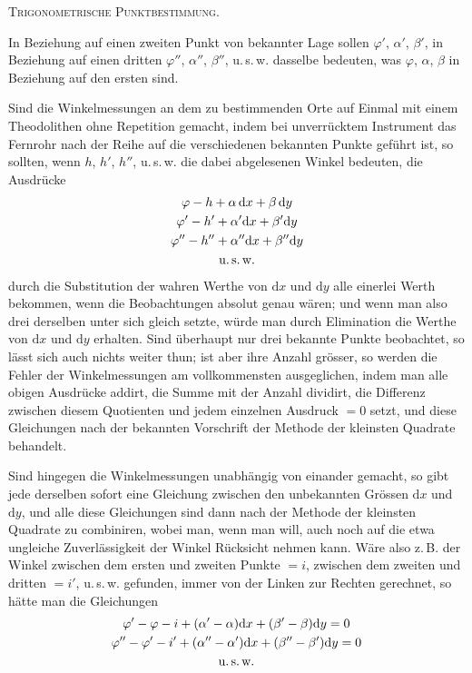 \begingroup
\clearpage
{}\hfill\textsc{Trigonometrische Punktbestimmung.}\hfill\mbox{}\par\medskip
In Beziehung auf einen zweiten Punkt von bekannter Lage sollen $\varphi'$, $\alpha'$, $\beta'$, in Beziehung auf einen dritten $\varphi''$, $\alpha''$, $\beta''$, u.\,s.\,w. dasselbe bedeuten, was $\varphi$, $\alpha$, $\beta$ in Beziehung auf den ersten sind.

Sind die Winkelmessungen an dem zu bestimmenden Orte auf Einmal mit einem Theodolithen ohne Repetition gemacht, indem bei unverrücktem Instrument das Fernrohr nach der Reihe auf die verschiedenen bekannten Punkte geführt ist, so sollten, wenn $h$, $h'$, $h''$, u.\,s.\,w. die dabei abgelesenen Winkel bedeuten, die Ausdrücke
\[
\begin{gathered}
\varphi-h+\alpha\,\mathrm dx+\beta\,\mathrm dy\\
\varphi'-h'+\alpha'\mathrm dx+\beta'\mathrm dy\\
\varphi''-h''+\alpha''\mathrm dx+\beta''\mathrm dy\\
\text{u.\,s.\,w.}
\end{gathered}
\]
durch die Substitution der wahren Werthe von $\mathrm dx$ und $\mathrm dy$ alle einerlei Werth bekommen, wenn die Beobachtungen absolut genau wären; und wenn man also drei derselben unter sich gleich setzte, würde man durch Elimination die Werthe von $\mathrm dx$ und $\mathrm dy$ erhalten. Sind überhaupt nur drei bekannte Punkte beobachtet, so lässt sich auch nichts weiter thun; ist aber ihre Anzahl grösser, so werden die Fehler der Winkelmessungen am vollkommensten ausgeglichen, indem man alle obigen Ausdrücke addirt, die Summe mit der Anzahl dividirt, die Differenz zwischen diesem Quotienten und jedem einzelnen Ausdruck $=0$ setzt, und diese Gleichungen nach der bekannten Vorschrift der Methode der kleinsten Quadrate behandelt.

Sind hingegen die Winkelmessungen unabhängig von einander gemacht, so gibt jede derselben sofort eine Gleichung zwischen den unbekannten Grössen $\mathrm dx$ und $\mathrm dy$, und alle diese Gleichungen sind dann nach der Methode der kleinsten Quadrate zu combiniren, wobei man, wenn man will, auch noch auf die etwa ungleiche Zuverlässigkeit der Winkel Rücksicht nehmen kann. Wäre also z.\,B. der Winkel zwischen dem ersten und zweiten Punkte $=i$, zwischen dem zweiten und dritten $=i'$, u.\,s.\,w. gefunden, immer von der Linken zur Rechten gerechnet, so hätte man die Gleichungen
\[
\begin{gathered}
\varphi'-\varphi-i+(\alpha'-\alpha)\mathrm dx+(\beta'-\beta)\mathrm dy=0\\
\varphi''-\varphi'-i'+(\alpha''-\alpha')\mathrm dx+(\beta''-\beta')\mathrm dy=0\\
\text{u.\,s.\,w.}
\end{gathered}
\]

